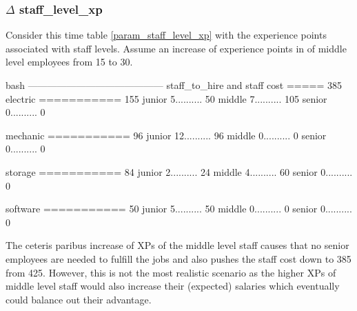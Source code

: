     \subsubsection{$\Delta$ staff\_level\_xp}
    Consider this time table \ref{param_staff_level_xp} with the experience points associated with
    staff levels. Assume an increase of experience points in of middle level employees from 15 to 30.
    \bigskip
    \newline
        \vspace{2pt}
        \begin{boxminted}{bash}
            ------------------------------------------
            staff_to_hire and staff cost ===== 385
            electric   =========== 155
            junior     5.......... 50
            middle     7.......... 105
            senior     0.......... 0
            
            mechanic   =========== 96
            junior     12.......... 96
            middle     0.......... 0
            senior     0.......... 0
            
            storage   =========== 84
            junior     2.......... 24
            middle     4.......... 60
            senior     0.......... 0
            
            software   =========== 50
            junior     5.......... 50
            middle     0.......... 0
            senior     0.......... 0            
        \end{boxminted}
    \newline
    The ceteris paribus increase of XPs of the middle level staff causes that no senior employees are
    needed to fulfill the jobs and also pushes the staff cost down to 385 from 425. However, this is
    not the most realistic scenario as the higher XPs of middle level staff would also increase 
    their (expected) salaries which eventually could balance out their advantage.

